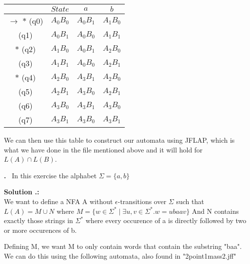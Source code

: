 \documentclass{article}
\newcounter{problem}
\newcounter{solution}
\newcommand\Problem{%
  \stepcounter{problem}%
  \textbf{\theproblem.}~%
  \setcounter{solution}{0}%
}
\newcommand\ASolution{%
  \stepcounter{solution}%
  \textbf{Solution \theproblem.\thesolution:}\\%
}
\begin{document}
\begin{table}[h!]
\centering
 \begin{tabular}{||c c c c||} 
 \hline
 & $State$ & $a$ & $b$ \\ [0.5ex] 
 \hline\hline
 $\rightarrow$ $*$ (q0) & $A_0B_0$ & $A_0B_1$ & $A_1B_0$ \\ 
    \hfill          (q1) & $A_0B_1$ & $A_0B_0$ & $A_1B_1$ \\
    \hfill $*$ (q2) & $A_1B_0$ & $A_0B_1$ & $A_2B_0$ \\
    \hfill           (q3) & $A_1B_1$ & $A_0B_0$ & $A_2B_1$\\
    \hfill $*$ (q4) & $A_2B_0$ & $A_3B_1$ & $A_2B_0$ \\
    \hfill           (q5) & $A_2B_1$ & $A_3B_0$ & $A_2B_1$ \\
    \hfill           (q6) & $A_3B_0$ & $A_3B_1$ & $A_3B_0$ \\
    \hfill           (q7) & $A_3B_1$ & $A_3B_0$ & $A_3B_1$ \\[1ex] 
 \hline
 \end{tabular}
\end{table}
\begin{center}
  We can then use this table to construct our automata using JFLAP, which is what we have done in the file mentioned above and it will hold for $L(A) \cap L(B)$.
\end{center} 
\newpage
\Problem In this exercise the alphabet $\Sigma = \{a,b\}$

\ASolution We want to define a NFA A without 
$\epsilon$-transitions over $\Sigma$ such that $L(A) = M \cup 
N$ where $M=\{w \in \Sigma^* \mid \exists u,v \in \Sigma^*. w =
ubaav\}$ And N contains exactly those strings in $\Sigma^*$ 
where every occurence of a is directly followed by two or more 
occurences of b.

Defining M, we want M to only contain words that contain the substring "baa". 
We can do this using the following automata, also found in "2point1mass2.jff"

\begin{center}
\end{center}
\end{document}
